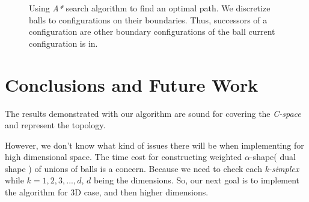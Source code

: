 \documentclass[11pt]{article}
\begin{document}
\begin{figure}
	\caption{\label{Astar}} Using \emph{A*} search algorithm to find an optimal path. We discretize balls to configurations on their boundaries. Thus, successors of a configuration are other boundary configurations of the ball current configuration is in. 
\end{figure}
%
\section{Conclusions and Future Work}\label{conclusions}
\indent\indent The results demonstrated with our algorithm are sound for covering the \emph{C-space} and represent the topology.  

\indent However, we don't know what kind of issues there will be when implementing for high dimensional space. The time cost for constructing weighted $\alpha$-shape( dual shape ) of unions of balls is a concern. Because we need to check each \emph{k-simplex} while $k = 1, 2, 3, ..., d$, $d$ being the dimensions. So, our next goal is to implement the algorithm for 3D case, and then higher dimensions.
\end{document}
